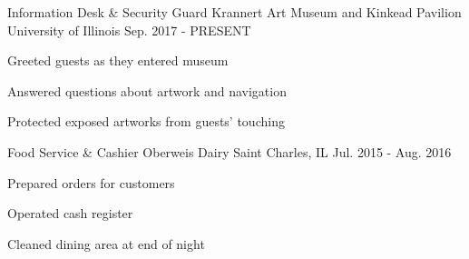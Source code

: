 

\begin{cventries}

  \cventry
    {Information Desk \& Security Guard} %
    {Krannert Art Museum and Kinkead Pavilion} %
    {University of Illinois} %
    {Sep. 2017 - PRESENT} %
    {
      \begin{cvitems} %
        \item {Greeted guests as they entered museum}
        \item {Answered questions about artwork and navigation}
        \item {Protected exposed artworks from guests' touching}
      \end{cvitems}
    }

  \cventry
    {Food Service \& Cashier} %
    {Oberweis Dairy} %
    {Saint Charles, IL} %
    {Jul. 2015 - Aug. 2016} %
    {
      \begin{cvitems}
        \item {Prepared orders for customers}
        \item {Operated cash register}
        \item {Cleaned dining area at end of night}
      \end{cvitems}
    }

\end{cventries}
